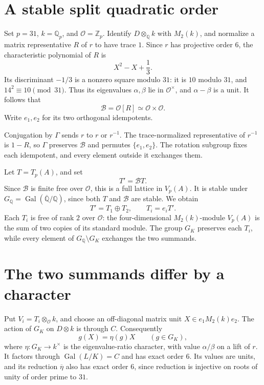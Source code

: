 \documentclass[11pt]{article}
\newcommand{\Q}{\mathbb Q}
\newcommand{\Z}{\mathbb Z}
\DeclareMathOperator{\Gal}{Gal}
\begin{document}
\section{A stable split quadratic order}

Set \(p=31\), \(k=\Q_p\), and \(\mathcal O=\Z_p\). Identify
\(D\otimes_{\Q}k\) with \(M_2(k)\), and normalize a matrix
representative \(R\) of \(r\) to have trace \(1\). Since \(r\)
has projective order \(6\), the characteristic polynomial of \(R\) is
\[
 X^2-X+\frac13.
\]
Its discriminant \(-1/3\) is a nonzero square modulo \(31\): it is
\(10\) modulo \(31\), and \(14^2\equiv10\pmod{31}\). Thus its
eigenvalues \(\alpha,\beta\) lie in \(\mathcal O^\times\), and
\(\alpha-\beta\) is a unit. It follows that
\[
 \mathcal B=\mathcal O[R]\simeq\mathcal O\times\mathcal O.
\]
Write \(e_1,e_2\) for its two orthogonal idempotents.

Conjugation by \(\Gamma\) sends \(r\) to \(r\) or \(r^{-1}\).
The trace-normalized representative of \(r^{-1}\) is \(1-R\), so
\(\Gamma\) preserves \(\mathcal B\) and permutes
\(\{e_1,e_2\}\). The rotation subgroup fixes each idempotent, and
every element outside it exchanges them.

Let \(T=T_p(A)\), and set
\[
 T'=\mathcal B T.
\]
Since \(\mathcal B\) is finite free over \(\mathcal O\), this is a
full lattice in \(V_p(A)\). It is stable under
\(G_{\Q}=\Gal(\overline{\Q}/\Q)\), since both \(T\) and
\(\mathcal B\) are stable. We obtain
\[
 T'=T_1\oplus T_2,\qquad T_i=e_iT'.
\]
Each \(T_i\) is free of rank \(2\) over \(\mathcal O\): the
four-dimensional \(M_2(k)\)-module \(V_p(A)\) is the sum of two
copies of its standard module. The group \(G_K\) preserves each
\(T_i\), while every element of \(G_{\Q}\setminus G_K\) exchanges
the two summands.

\section{The two summands differ by a character}

Put \(V_i=T_i\otimes_{\mathcal O}k\), and choose an off-diagonal
matrix unit \(X\in e_1M_2(k)e_2\). The action of \(G_K\) on
\(D\otimes k\) is through \(C\). Consequently
\[
 g(X)=\eta(g)X\qquad(g\in G_K),
\]
where \(\eta:G_K\to k^\times\) is the eigenvalue-ratio character,
with value \(\alpha/\beta\) on a lift of \(r\). It factors through
\(\Gal(L/K)=C\) and has exact order \(6\). Its values are units,
and its reduction \(\overline\eta\) also has exact order \(6\),
since reduction is injective on roots of unity of order prime to \(31\).
\end{document}
